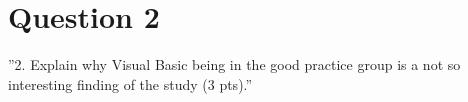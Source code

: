 \section{Question 2}

''2. Explain why Visual Basic being in the good practice group is a not so interesting finding of the study
(3 pts).''